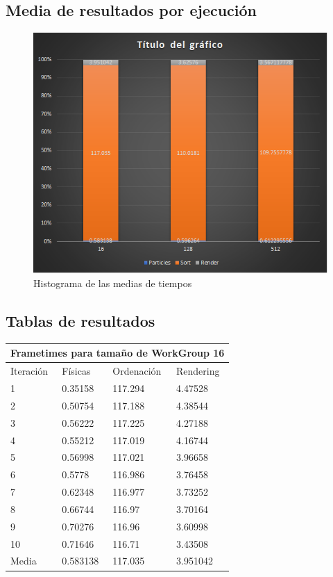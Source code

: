\documentclass[10pt,oneside,a4paper]{article}
\begin{document}
\subsection{Media de resultados por ejecución}\begin{figure}[h!tbp]
\centering
\includegraphics[width=.8\linewidth]{img/hist.png}
\caption{Histograma de las medias de tiempos}
\end{figure}

\subsection{Tablas de resultados}

\begin{tabular}{ |p{1.3cm}||p{2cm}|p{2cm}|p{2cm}| }
 \hline
 \multicolumn{4}{|c|}{Frametimes para tamaño de WorkGroup 16} \\
 \hline
 Iteración& Físicas&Ordenación&Rendering\\
 \hline
1   & 0.35158&117.294&4.47528\\
2&0.50754&117.188&4.38544\\
3&0.56222&117.225&4.27188\\
4&0.55212&117.019&4.16744\\
5&0.56998&117.021&3.96658\\
6&0.5778&116.986&3.76458\\
7&0.62348&116.977&3.73252\\
8&0.66744&116.97&3.70164\\
9&0.70276&116.96&3.60998\\
10&0.71646&116.71&3.43508\\
Media&0.583138&117.035&3.951042\\
 \hline
\end{tabular}\\\vspace{1cm}
\end{document}
